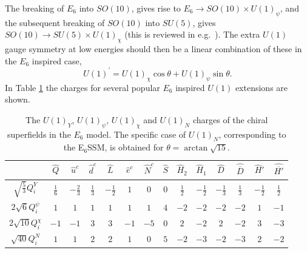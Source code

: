 \documentclass[preprint,amsmath,amssymb,aps,superscriptaddress,prd,showpacs,floatfix,nofootinbib]{revtex4-1}
\newcommand{\be}{\begin{equation}}
\newcommand{\ee}{\end{equation}}
\begin{document}
The breaking of $E_6$ into $SO(10)$, gives rise to $E_6\to
SO(10)\times U(1)_{\psi}$, and the subsequent breaking of $SO(10)$
into $SU(5)$, gives $SO(10)\to SU(5)\times U(1)_{\chi}$ (this is
reviewed in e.g.~\cite{Langacker:2008yv}). The extra $U(1)$ gauge
symmetry at low energies should then be a linear combination of these
in the $E_6$ inspired case, \be U(1)^\prime = U(1)_{\chi}\cos\theta 
+ U(1)_{\psi}\sin\theta . \ee In Table \ref{tab:E6charges} the
charges for several popular $E_6$ inspired $U(1)$ extensions are
shown.
\begin{table}[h]
\centering
\begin{ruledtabular}
\begin{tabular}{cccccccccccccc}
 & $\hat{Q}$ & $\hat{u}^c$ & $\hat{d}^c$ & $\hat{L}$ & $\hat{e}^c$ & $\hat{N}^c$ & $\hat{S}$ & $\hat{H}_2$ & $\hat{H}_1$ & $\hat{D}$ & $\hat{\overline{D}}$ & $\hat{H}'$ & $\hat{\overline{H'}}$ \\[1mm]
\hline
$\sqrt{\frac{5}{3}}Q_i^Y$ & $\frac{1}{6}$ & $-\frac{2}{3}$ & $\frac{1}{3}$ & $-\frac{1}{2}$ & $1$ & $0$ & $0$ & $\frac{1}{2}$ & $-\frac{1}{2}$ & $-\frac{1}{3}$ & $\frac{1}{3}$ & $-\frac{1}{2}$ & $\frac{1}{2}$ \\[1mm]
$2\sqrt{6}Q_i^\psi$ & $1$ & $1$ & $1$ & $1$ & $1$ & $1$ & $4$ & $-2$ & $-2$ & $-2$ & $-2$ & $1$ & $-1$\\[1mm]
$2\sqrt{10}Q_i^\chi$ & $-1$ & $-1$ & $3$ & $3$ & $-1$ & $-5$ & $0$ & $2$ & $-2$ & $2$ & $-2$ & $3$ & $-3$\\[1mm]
$\sqrt{40}Q_i^N$ & $1$ & $1$ & $2$ & $2$ & $1$ & $0$ & $5$ & $-2$ & $-3$ & $-2$ & $-3$ & $2$ & $-2$ \\[1mm]
\end{tabular}
\end{ruledtabular}
\caption{The $U(1)_Y$, $U(1)_\psi$, $U(1)_\chi$ and $U(1)_N$ charges of the chiral superfields in the $E_6$ model. The specific case of $U(1)_N$, corresponding to the E$_6$SSM, is obtained for $\theta=\arctan\sqrt{15}$.}
\label{tab:E6charges}
\end{table}
\end{document}
